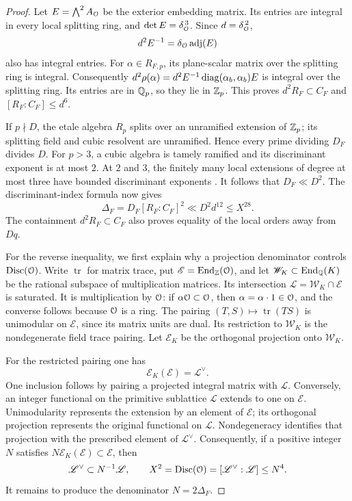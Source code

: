 \begin{proof}
Let \(E=\bigwedge^2 A_{\mathcal O}\) be the exterior embedding matrix.
Its entries are integral in every local splitting ring, and
\(\det E=\delta_{\mathcal O}^{\,3}\).  Since \(d=\delta_{\mathcal O}^{\,2}\),
\[
 d^2 E^{-1}=\delta_{\mathcal O}\operatorname{adj}(E)
\]
also has integral entries.  For \(\alpha\in R_{F,p}\), its
plane-scalar matrix over the splitting ring is integral.
Consequently
\(d^2\rho(\alpha)=d^2E^{-1}\operatorname{diag}(\alpha_b,\alpha_b)E\)
is integral over the splitting ring.  Its entries
are in \(\mathbb Q_p\), so they lie in \(\mathbb Z_p\).  This proves
\(d^2R_F\subset C_F\) and \([R_F:C_F]\le d^6\).

If \(p\nmid D\), the etale algebra \(R_p\) splits over an unramified
extension of \(\mathbb Z_p\); its splitting field and cubic resolvent are
unramified.  Hence every prime dividing \(D_F\) divides \(D\).
For \(p>3\), a cubic algebra is tamely ramified and its discriminant
exponent is at most \(2\).  At \(2\) and \(3\), the finitely many
local extensions of degree at most three have bounded discriminant
exponents \cite[Proposition~7.64 and Remark~7.65]{MilneANT}.
It follows that \(D_F\ll D^2\).  The discriminant-index formula now
gives
\[
 \Delta_F=D_F[R_F:C_F]^2\ll D^2d^{12}\le X^{28}.
\]
The containment \(d^2R_F\subset C_F\) also proves equality of the
local orders away from \(Dq\).

For the reverse inequality, we first explain why a projection
denominator controls \(\operatorname{Disc}(\mathcal O)\).  Write \(\operatorname{tr}\) for
matrix trace, put \(\mathscr E=\operatorname{End}_\mathbb Z(\mathcal O)\), and let
\(\mathscr W_K\subset\operatorname{End}_\mathbb Q(K)\) be the rational subspace of
multiplication matrices.  Its intersection
\(\mathscr L=\mathscr W_K\cap\mathscr E\) is saturated.  It is
multiplication by \(\mathcal O\): if \(\alpha\mathcal O\subset\mathcal O\), then
\(\alpha=\alpha\cdot1\in\mathcal O\), and the converse follows because
\(\mathcal O\) is a ring.  The pairing
\((T,S)\mapsto\operatorname{tr}(TS)\) is unimodular on
\(\mathscr E\), since its matrix units are dual.  Its restriction
to \(\mathscr W_K\) is the nondegenerate field trace pairing.
Let \(\mathcal E_K\) be the orthogonal projection onto
\(\mathscr W_K\).

For the restricted pairing one has
\begin{equation}
 \mathcal E_K(\mathscr E)=\mathscr L^\vee.
 \label{eq:ext-projected-dual}
\end{equation}
One inclusion follows by pairing a projected integral matrix with
\(\mathscr L\).  Conversely, an integer functional on the primitive
sublattice \(\mathscr L\) extends to one on \(\mathscr E\).
Unimodularity represents the extension by an element of
\(\mathscr E\); its orthogonal projection represents the original
functional on \(\mathscr L\).  Nondegeneracy identifies that
projection with the prescribed element of \(\mathscr L^\vee\).
Consequently, if a positive integer \(N\) satisfies
\(N\mathcal E_K(\mathscr E)\subset\mathscr E\), then
\[
 \mathscr L^\vee\subset N^{-1}\mathscr L,\qquad
 X^2=\operatorname{Disc}(\mathcal O)=[\mathscr L^\vee:\mathscr L]\le N^4.
\]
It remains to produce the denominator \(N=2\Delta_F\).


\end{proof}
